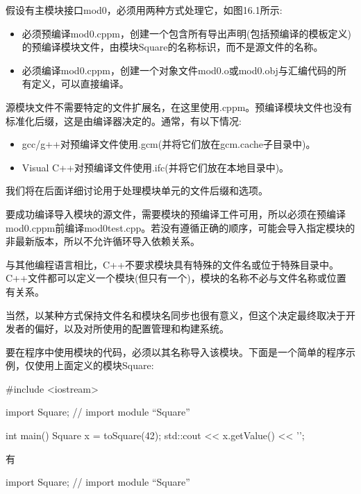 假设有主模块接口mod0，必须用两种方式处理它，如图16.1所示:

\begin{itemize}
\item
必须预编译mod0.cppm，创建一个包含所有导出声明(包括预编译的模板定义)的预编译模块文件，由模块Square的名称标识，而不是源文件的名称。

\item
必须编译mod0.cppm，创建一个对象文件mod0.o或mod0.obj与汇编代码的所有定义，可以直接编译。
\end{itemize}

源模块文件不需要特定的文件扩展名，在这里使用.cppm。预编译模块文件也没有标准化后缀，这是由编译器决定的。通常，有以下情况:

\begin{itemize}
\item
gcc/g++对预编译文件使用.gcm(并将它们放在gcm.cache子目录中)。

\item
Visual C++对预编译文件使用.ifc(并将它们放在本地目录中)。
\end{itemize}

我们将在后面详细讨论用于处理模块单元的文件后缀和选项。

要成功编译导入模块的源文件，需要模块的预编译工件可用，所以必须在预编译mod0.cppm前编译mod0test.cpp。若没有遵循正确的顺序，可能会导入指定模块的非最新版本，所以不允许循环导入依赖关系。

与其他编程语言相比，C++不要求模块具有特殊的文件名或位于特殊目录中。C++文件都可以定义一个模块(但只有一个)，模块的名称不必与文件名称或位置有关系。

当然，以某种方式保持文件名和模块名同步也很有意义，但这个决定最终取决于开发者的偏好，以及对所使用的配置管理和构建系统。


要在程序中使用模块的代码，必须以其名称导入该模块。下面是一个简单的程序示例，仅使用上面定义的模块Square:


\begin{cpp}
#include <iostream>

import Square; // import module “Square”

int main()
{
	Square x = toSquare(42);
	std::cout << x.getValue() << '\n';
}
\end{cpp}

有

\begin{cpp}
import Square; // import module “Square”
\end{cpp}

